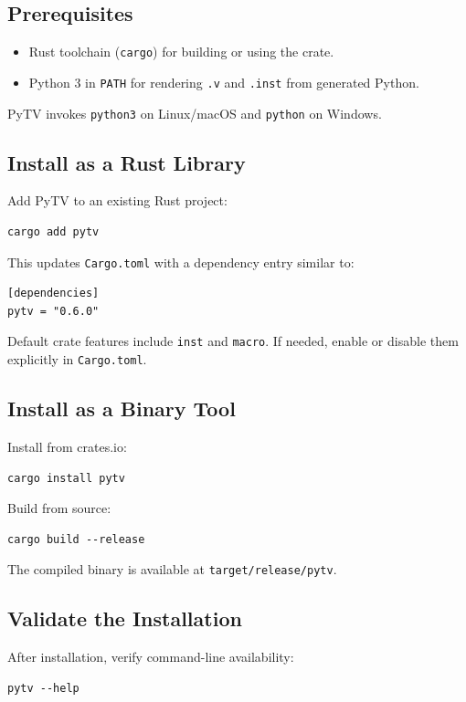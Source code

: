 \subsection{Prerequisites}
\begin{itemize}
  \item Rust toolchain (\texttt{cargo}) for building or using the crate.
  \item Python 3 in \texttt{PATH} for rendering \texttt{.v} and \texttt{.inst} from generated Python.
\end{itemize}

PyTV invokes \texttt{python3} on Linux/macOS and \texttt{python} on Windows.

\subsection{Install as a Rust Library}
Add PyTV to an existing Rust project:
\begin{verbatim}
cargo add pytv
\end{verbatim}

This updates \texttt{Cargo.toml} with a dependency entry similar to:
\begin{verbatim}
[dependencies]
pytv = "0.6.0"
\end{verbatim}

Default crate features include \texttt{inst} and \texttt{macro}.
If needed, enable or disable them explicitly in \texttt{Cargo.toml}.

\subsection{Install as a Binary Tool}
Install from crates.io:
\begin{verbatim}
cargo install pytv
\end{verbatim}

Build from source:
\begin{verbatim}
cargo build --release
\end{verbatim}
The compiled binary is available at \texttt{target/release/pytv}.

\subsection{Validate the Installation}
After installation, verify command-line availability:
\begin{verbatim}
pytv --help
\end{verbatim}

